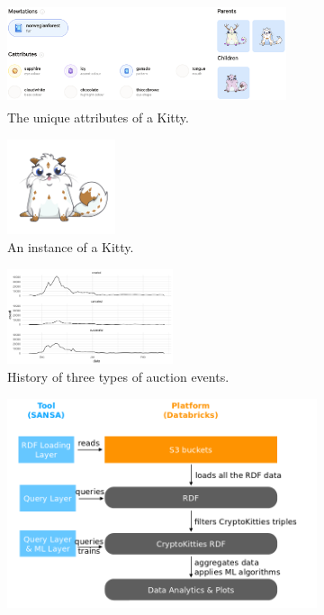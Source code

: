 \begin{figure}[t]
\begin{subfigure}[b]{0.95\textwidth}
\centering
\includegraphics[height=3cm,width=0.9\textwidth]{images/7_implemenation_and_usecases/kittie_attributes.png}
\caption{The unique attributes of a Kitty.}
\label{fig:attributes}
\end{subfigure}
\begin{subfigure}[b]{0.5\textwidth}
\centering
\includegraphics[height=2.8cm]{images/7_implemenation_and_usecases/kittie.png}
\caption{An instance of a Kitty.}
\label{fig:kitty}
\end{subfigure}
\begin{subfigure}[b]{0.5\textwidth}
\centering
\includegraphics[height=2.8cm,width=\textwidth]{images/7_implemenation_and_usecases/auction_event.png}
\caption{History of three types of auction events.}
\label{fig:auction}
\end{subfigure}
\begin{subfigure}[b]{0.5\textwidth}
\centering
\includegraphics[width=1\textwidth]{images/7_implemenation_and_usecases/CryptoSANSA-pipeline.png}

\end{subfigure}
\end{figure}

